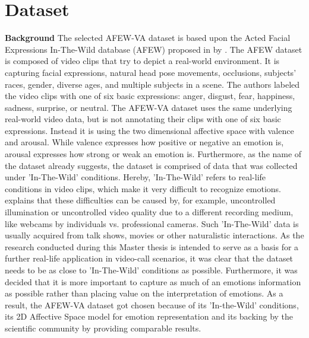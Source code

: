 \section{Dataset}
\textbf{Background}
\newline
The selected AFEW-VA dataset \citet{Kossaifi:2017:AFEW-VADatabase} is based upon the Acted Facial Expressions In-The-Wild database (AFEW) proposed in \citeyear{Dhall:2012:AFEW} by \citet{Dhall:2012:AFEW}. The AFEW dataset is composed of video clips that try to depict a real-world environment. It is capturing facial expressions, natural head pose movements, occlusions, subjects' races, gender, diverse ages, and multiple subjects in a scene. The authors labeled the video clips with one of six basic expressions: anger, disgust, fear, happiness, sadness, surprise, or neutral.
\newline\newline
The AFEW-VA dataset\citep{Kossaifi:2017:AFEW-VADatabase} uses the same underlying real-world video data, but is not annotating their clips with one of six basic expressions. Instead it is using the two dimensional affective space with valence and arousal. While valence expresses how positive or negative an emotion is, arousal expresses how strong or weak an emotion is.
\newline\newline
Furthermore, as the name of the dataset already suggests, the dataset is comprised of data that was collected under 'In-The-Wild' conditions. Hereby, 'In-The-Wild' refers to real-life conditions in video clips, which make it very difficult to recognize emotions. \citet{Salah:2018:VideoBasedER} explains that these difficulties can be caused by, for example, uncontrolled illumination or uncontrolled video quality due to a different recording medium, like webcams by individuals vs. professional cameras. Such 'In-The-Wild' data is usually acquired from talk shows, movies or other naturalistic interactions. 
\newline\newline
As the research conducted during this Master thesis is intended to serve as a basis for a further real-life application in video-call scenarios, it was clear that the dataset needs to be as close to 'In-The-Wild' conditions as possible. Furthermore, it was decided that it is more important to capture as much of an emotions information as possible rather than placing value on the interpretation of emotions. As a result, the AFEW-VA dataset got chosen because of its 'In-the-Wild' conditions, its 2D Affective Space model for emotion representation and its backing by the scientific community by providing comparable results.
